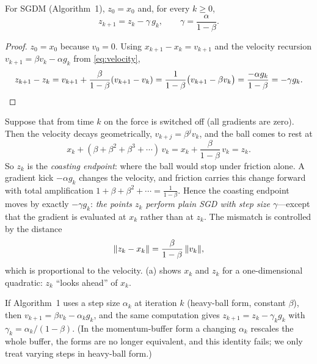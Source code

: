 \begin{lemma}\label{lem:z}
For SGDM (Algorithm~1), $z_0=x_0$ and, for every $k\ge0$,
\begin{equation}\label{eq:z-sgd}
  z_{k+1}=z_k-\gamma\,g_k,\qquad\gamma=\frac{\alpha}{1-\beta}.
\end{equation}
\end{lemma}

\begin{proof}
$z_0=x_0$ because $v_0=0$. Using $x_{k+1}-x_k=v_{k+1}$ and the velocity recursion
$v_{k+1}=\beta v_k-\alpha g_k$ from \eqref{eq:velocity},
\[
  z_{k+1}-z_k=v_{k+1}+\frac{\beta}{1-\beta}(v_{k+1}-v_k)
  =\frac{1}{1-\beta}\bigl(v_{k+1}-\beta v_k\bigr)=\frac{-\alpha g_k}{1-\beta}=-\gamma g_k .\qedhere
\]
\end{proof}

\begin{tcolorbox}[intuition,title=Physical meaning of $z_k$]
Suppose that from time $k$ on the force is switched off (all gradients are zero). Then
the velocity decays geometrically, $v_{k+j}=\beta^jv_k$, and the ball comes to rest at
\[
  x_k+(\beta+\beta^2+\beta^3+\cdots)\,v_k=x_k+\frac{\beta}{1-\beta}\,v_k=z_k .
\]
So $z_k$ is the \emph{coasting endpoint}: where the ball would stop under friction alone.
A gradient kick $-\alpha g_k$ changes the velocity, and friction carries this change
forward with total amplification $1+\beta+\beta^2+\cdots=\frac1{1-\beta}$. Hence the
coasting endpoint moves by exactly $-\gamma g_k$: \emph{the points $z_k$ perform plain
SGD with step size $\gamma$}---except that the gradient is evaluated at $x_k$ rather than
at $z_k$. The mismatch is controlled by the distance
\begin{equation}\label{eq:z-minus-x}
  \lVert z_k-x_k\rVert=\frac{\beta}{1-\beta}\,\lVert v_k\rVert,
\end{equation}
which is proportional to the velocity. (a) shows $x_k$ and $z_k$ for
a one-dimensional quadratic: $z_k$ ``looks ahead'' of $x_k$.
\end{tcolorbox}

\begin{remark}\label{rem:varying}
If Algorithm~1 uses a step size $\alpha_k$ at iteration $k$ (heavy-ball form, constant
$\beta$), then $v_{k+1}=\beta v_k-\alpha_kg_k$, and the same computation gives
$z_{k+1}=z_k-\gamma_kg_k$ with $\gamma_k=\alpha_k/(1-\beta)$. (In the momentum-buffer form
a changing $\alpha_k$ rescales the whole buffer, the forms are no longer equivalent, and
this identity fails; we only treat varying steps in heavy-ball form.)
\end{remark}

